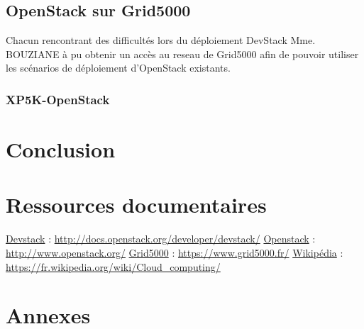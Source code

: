 \documentclass{report}
\begin{document}
            
    \section{OpenStack sur Grid5000}
        Chacun rencontrant des difficultés lors du déploiement DevStack Mme. BOUZIANE à pu obtenir un accès au reseau 
        de Grid5000 afin de pouvoir utiliser les scénarios de déploiement d'OpenStack existants.
        \subsection{XP5K-OpenStack}
            



\newpage
\chapter*{Conclusion}


\newpage
\chapter*{Ressources documentaires}
\href{http://docs.openstack.org/developer/devstack/}{Devstack} :
\url{http://docs.openstack.org/developer/devstack/}
\bigbreak
\href{http://www.openstack.org/}{Openstack} :
\url{http://www.openstack.org/}
\bigbreak
\href{https://www.grid5000.fr/}{Grid5000} :
\url{https://www.grid5000.fr/}
\bigbreak
\href{https://fr.wikipedia.org/wiki/Cloud_computing/}{Wikipédia} :
\url{https://fr.wikipedia.org/wiki/Cloud_computing/}



\newpage
\chapter*{Annexes}
\end{document}

